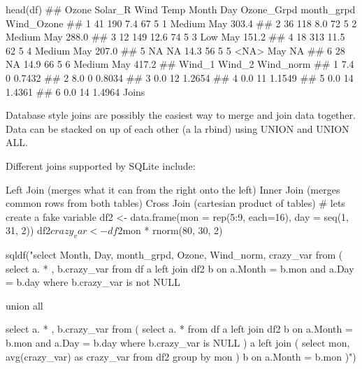head(df)
##   Ozone Solar_R Wind Temp Month Day Ozone_Grpd month_grpd Wind_Ozone
## 1    41     190  7.4   67     5   1     Medium        May      303.4
## 2    36     118  8.0   72     5   2     Medium        May      288.0
## 3    12     149 12.6   74     5   3        Low        May      151.2
## 4    18     313 11.5   62     5   4     Medium        May      207.0
## 5    NA      NA 14.3   56     5   5       <NA>        May         NA
## 6    28      NA 14.9   66     5   6     Medium        May      417.2
##   Wind_1 Wind_2 Wind_norm
## 1    7.4      0    0.7432
## 2    8.0      0    0.8034
## 3    0.0     12    1.2654
## 4    0.0     11    1.1549
## 5    0.0     14    1.4361
## 6    0.0     14    1.4964
Joins

Database style joins are possibly the easiest way to merge and join data together. Data can be stacked on up of each other (a la rbind) using UNION and UNION ALL.

Different joins supported by SQLite include:

Left Join (merges what it can from the right onto the left)
Inner Join (merges common rows from both tables)
Cross Join (cartesian product of tables)
# lets create a fake variable
df2 <- data.frame(mon = rep(5:9, each=16), day = seq(1, 31, 2))
df2$crazy_var <- df2$mon         * rnorm(80, 30, 2)

sqldf("select Month, Day, month_grpd, Ozone, Wind_norm, crazy_var 
      from
      (
        select a.       * , b.crazy_var
        from
        df a
        left join
        df2 b
        on a.Month = b.mon and a.Day = b.day
        where b.crazy_var is not NULL

        union all

        select a.       * , b.crazy_var
        from
        (
          select a.       * 
          from
          df a
          left join
          df2 b
          on a.Month = b.mon and a.Day = b.day
          where b.crazy_var is NULL
        ) a
        left join
        (
          select mon, avg(crazy_var) as crazy_var
          from
          df2
          group by mon
        ) b
        on a.Month = b.mon
      )")
